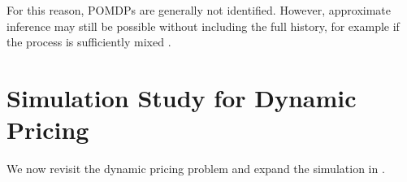\documentclass[12pt,a4paper]{article}
\theoremstyle{definition}
\begin{document}
For this reason, POMDPs are generally not identified. However,
approximate inference may still be possible without including the full
history, for example if the process is sufficiently mixed
\parencite{hu2023off}.

\section{Simulation Study for Dynamic Pricing}\label{sec:simulation_study}
We now revisit the dynamic pricing problem and expand the
simulation in . %
\end{document}
